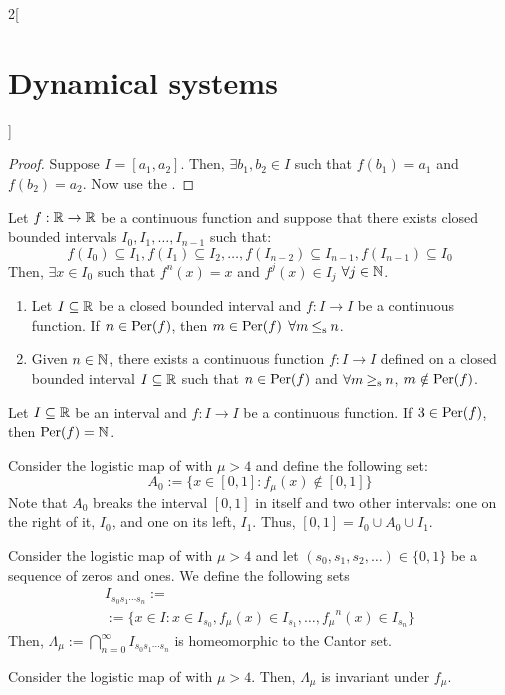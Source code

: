 \documentclass[../../../main_math.tex]{subfiles}
\begin{document}
\begin{multicols}{2}[\section{Dynamical systems}]
\begin{proposition}
  \end{proposition}
  \begin{proof}
    Suppose $I=[a_1,a_2]$. Then, $\exists b_1,b_2\in I$ such that $f(b_1)=a_1$ and $f(b_2)=a_2$. Now use the .
  \end{proof}
  \begin{lemma}
    Let $f:\mathbb{R}\rightarrow \mathbb{R}$ be a continuous function and suppose that there exists closed bounded intervals $I_0,I_1,\ldots, I_{n-1}$ such that:
    $$f(I_0)\subseteq I_1,f(I_1)\subseteq I_2,\ldots, f(I_{n-2})\subseteq I_{n-1}, f(I_{n-1})\subseteq I_0$$
    Then, $\exists x\in I_0$ such that $f^n(x)=x$ and $f^j(x)\in I_j$ $\forall j\in\mathbb{N}$.
  \end{lemma}
  \begin{theorem}\hfill
    \begin{enumerate}
      \item Let $I\subseteq\mathbb{R}$ be a closed bounded interval and $f:I\rightarrow I$ be a continuous function. If $n\in\operatorname{Per}(f)$, then $m\in\operatorname{Per}(f)$ $\forall m\mathbin{\leq_{\mathrm{s}}} n$.
      \item Given $n\in\mathbb{N}$, there exists a continuous function $f:I\rightarrow I$ defined on a closed bounded interval $I\subseteq\mathbb{R}$ such that $n\in\operatorname{Per}(f)$ and $\forall m\mathbin{\geq_{\mathrm{s}}} n$, $m\notin\operatorname{Per}(f)$.
    \end{enumerate}
  \end{theorem}
  \begin{corollary}
    Let $I\subseteq\mathbb{R}$ be an interval and $f:I\rightarrow I$ be a continuous function. If $3\in \operatorname{Per}(f)$, then $\operatorname{Per}(f)=\mathbb{N}$.
  \end{corollary}
  \begin{definition}
    Consider the logistic map of  with $\mu >4$ and define the following set: $$A_0:=\{x\in [0,1]: f_\mu(x)\notin [0,1]\}$$ Note that $A_0$ breaks the interval $[0,1]$ in itself and two other intervals: one on the right of it, $I_0$, and one on its left, $I_1$. Thus, $[0,1]=I_0\cup A_0\cup I_1$.
  \end{definition}
  \begin{proposition}
    Consider the logistic map of  with $\mu >4$ and let $(s_0,s_1,s_2,\ldots)\in\{0,1\}$ be a sequence of zeros and ones. We define the following sets
    \begin{multline*}
      I_{s_0s_1\cdots s_n}:=\\:=\{x\in I: x\in I_{s_0}, f_\mu(x)\in I_{s_1},\ldots,{f_\mu}^n(x)\in I_{s_n}\}
    \end{multline*}
    Then, $\Lambda_\mu:=\bigcap_{n=0}^\infty I_{s_0s_1\cdots s_n}$ is homeomorphic to the Cantor set.
  \end{proposition}
  \begin{proposition}
    Consider the logistic map of  with $\mu >4$. Then, $\Lambda_\mu$ is invariant under $f_\mu$.
  \end{proposition}

\end{multicols}
\end{document}
